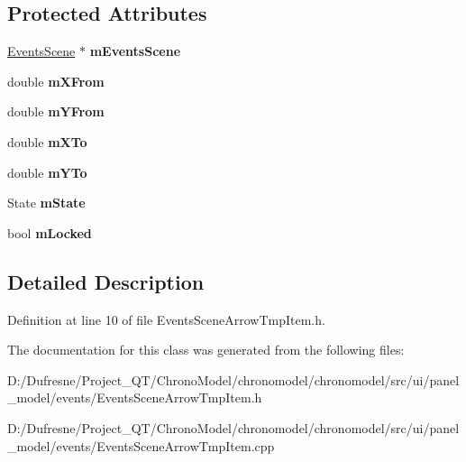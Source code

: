 \subsection*{Protected Attributes}
\begin{DoxyCompactItemize}
\item 
\hypertarget{class_events_scene_arrow_tmp_item_a4fa988a190569aaef0392e7d2093686c}{\hyperlink{class_events_scene}{Events\-Scene} $\ast$ {\bfseries m\-Events\-Scene}}\label{class_events_scene_arrow_tmp_item_a4fa988a190569aaef0392e7d2093686c}

\item 
\hypertarget{class_events_scene_arrow_tmp_item_aa2e4c457d04dadad2dd172e173443da4}{double {\bfseries m\-X\-From}}\label{class_events_scene_arrow_tmp_item_aa2e4c457d04dadad2dd172e173443da4}

\item 
\hypertarget{class_events_scene_arrow_tmp_item_a85c97cda3a2b34ec76743d65ccb30104}{double {\bfseries m\-Y\-From}}\label{class_events_scene_arrow_tmp_item_a85c97cda3a2b34ec76743d65ccb30104}

\item 
\hypertarget{class_events_scene_arrow_tmp_item_a709563e01b554d36e0d9c90b86d935c3}{double {\bfseries m\-X\-To}}\label{class_events_scene_arrow_tmp_item_a709563e01b554d36e0d9c90b86d935c3}

\item 
\hypertarget{class_events_scene_arrow_tmp_item_a558457a6f80111ce0412ab62e6b81ee6}{double {\bfseries m\-Y\-To}}\label{class_events_scene_arrow_tmp_item_a558457a6f80111ce0412ab62e6b81ee6}

\item 
\hypertarget{class_events_scene_arrow_tmp_item_a6f4b40acbafeac6f052702a90cd9086c}{State {\bfseries m\-State}}\label{class_events_scene_arrow_tmp_item_a6f4b40acbafeac6f052702a90cd9086c}

\item 
\hypertarget{class_events_scene_arrow_tmp_item_a972dccae483719ed71011dd5c17fbe6a}{bool {\bfseries m\-Locked}}\label{class_events_scene_arrow_tmp_item_a972dccae483719ed71011dd5c17fbe6a}

\end{DoxyCompactItemize}


\subsection{Detailed Description}


Definition at line 10 of file Events\-Scene\-Arrow\-Tmp\-Item.\-h.



The documentation for this class was generated from the following files\-:\begin{DoxyCompactItemize}
\item 
D\-:/\-Dufresne/\-Project\-\_\-\-Q\-T/\-Chrono\-Model/chronomodel/chronomodel/src/ui/panel\-\_\-model/events/Events\-Scene\-Arrow\-Tmp\-Item.\-h\item 
D\-:/\-Dufresne/\-Project\-\_\-\-Q\-T/\-Chrono\-Model/chronomodel/chronomodel/src/ui/panel\-\_\-model/events/Events\-Scene\-Arrow\-Tmp\-Item.\-cpp\end{DoxyCompactItemize}
